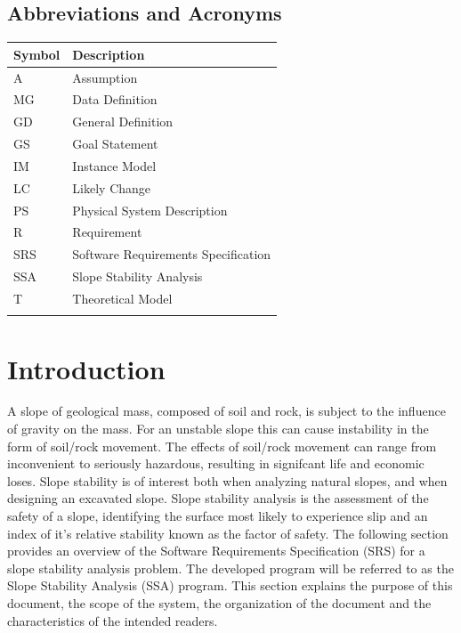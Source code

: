 \documentclass[12pt]{article}
\begin{document}
\subsection{Abbreviations and Acronyms}
\label{Sec:AaA}
\begin{longtable*}{l l}
\toprule
Symbol & Description
\\
\midrule
A & Assumption
\\
MG & Data Definition
\\
GD & General Definition
\\
GS & Goal Statement
\\
IM & Instance Model
\\
LC & Likely Change
\\
PS & Physical System Description
\\
R & Requirement
\\
SRS & Software Requirements Specification
\\
SSA & Slope Stability Analysis
\\
T & Theoretical Model
\\
\bottomrule
\label{Table:AaA}
\end{longtable*}
\section{Introduction}
\label{Sec:I}
A slope of geological mass, composed of soil and rock, is subject to the influence of gravity on the mass. For an unstable slope this can cause instability in the form of soil/rock movement. The effects of soil/rock movement can range from inconvenient to seriously hazardous, resulting in signifcant life and economic loses. Slope stability is of interest both when analyzing natural slopes, and when designing an excavated slope. Slope stability analysis is the assessment of the safety of a slope, identifying the surface most likely to experience slip and an index of it's relative stability known as the factor of safety.
The following section provides an overview of the Software Requirements Specification (SRS) for a slope stability analysis problem. The developed program will be referred to as the Slope Stability Analysis (SSA) program. This section explains the purpose of this document, the scope of the system, the organization of the document and the characteristics of the intended readers.
\end{document}
